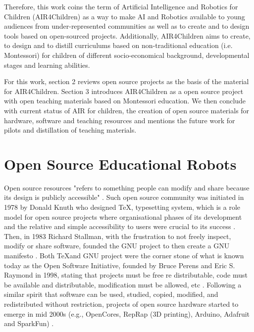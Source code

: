 \documentclass[sigconf]{acmart}
\begin{document}
Therefore, this work coins the term of Artificial Intelligence and Robotics for Children (AIR4Children) as a way to make AI and Robotics available to young audiences from under-represented communities as well as to create and to design tools based on open-sourced projects.
Additionally, AIR4Children aims to create, to design and to distill curriculums based on non-traditional education (i.e. Montessori) for children of different socio-economical background, developmental stages and learning abilities. 

For this work, section 2 reviews open source projects as the basis of the material for AIR4Children.
Section 3 introduces AIR4Children as a open source project with open teaching materials based on Montessori education. 
We then conclude with current status of AIR for children, the creation of open source materials for hardware, software and teaching resources and mentions the future work for pilots and distillation of teaching materials.

\section{Open Source Educational Robots}
Open source resources "refers to something people can modify and share because its design is publicly accessible" \cite{opensource2021}.
Such open source community was initiated in 1978 by Donald Knuth who designed \TeX, typesetting system, which is a role model for open source projects where organisational phases of its development and the relative and simple accessibility to users were crucial to its success \cite{gaudeul2007}.
Then, in 1983 Richard Stallman, with the frustration to not freely inspect, modify or share software, founded the GNU project to then create a GNU manifesto \cite{stallman1985}.
Both \TeX and GNU project were the corner stone of what is known today as the Open Software Initiative, founded by Bruce Perens and Eric S. Raymond in 1998, stating that projects must be free re distributable, code must be available and distributable, modification must be allowed, etc \cite{brasseur2018}.
Following a similar spirit that software can be used, studied, copied, modified, and redistributed without restriction, projects of open source hardware started to emerge in mid 2000s (e.g., OpenCores, RepRap (3D printing), Arduino, Adafruit and SparkFun) \cite{pearce2013}.
\end{document}
